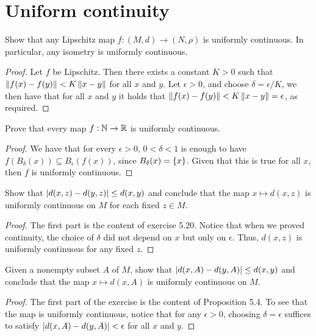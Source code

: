 \section{Uniform continuity}


\begin{exercise}{44}
Show that any Lipschitz map $f:(M,d)\to (N,\rho)$ is uniformly continuous. 
In particular, any isometry is uniformly continuous.
\end{exercise}
\begin{proof}
Let $f$ be Lipschitz.
Then there exists a constant $K>0$ such that $\left\lVert f(x)-f(y)\right\rVert < K\left\lVert x-y\right\rVert$ for all $x$ and $y$.
Let $\epsilon >0$, and choose $\delta = \epsilon/K$, we then have that for all $x$ and $y$ it holds that $\left\lVert f(x)-f(y)\right\rVert<K\left\lVert x-y\right\rVert=\epsilon$, as required.
\end{proof} 

\begin{exercise}{45}
Prove that every map $f:\mathbb{N}\to\mathbb{R}$ is uniformly continuous.
\end{exercise}
\begin{proof}
We have that for every $\epsilon>0$, $0<\delta<1$ is enough to have $f(B_\delta(x))\subseteq B_\epsilon(f(x))$, since $B_\delta(x)=\{x\}$.
Given that this is true for all $x$, then $f$ is uniformly continuous.
\end{proof} 

\begin{exercise}{46}
Show that $\left\lvert d(x,z)-d(y,z)\right\rvert \leq d(x,y)$ and conclude that the map $x\mapsto d(x,z)$ is uniformly continuous on $M$ for each fixed $z\in M$.
\end{exercise}
\begin{proof}
The first part is the content of exercise 5.20.
Notice that when we proved continuity, the choice of $\delta$ did not depend on $x$ but only on $\epsilon$.
Thus, $d(x,z)$ is uniformly continuous for any fixed $z$.
\end{proof} 

\begin{exercise}{47}
Given a nonempty subset $A$ of $M$, show that $\left\lvert d(x,A) - d(y,A)\right\rvert \leq d(x,y)$ and conclude that the map $x \mapsto d(x,A)$ is uniformly continuous on $M$.
\end{exercise}
\begin{proof}
The first part of the exercise is the content of Proposition 5.4.
To see that the map is uniformly continuous, notice that for any $\epsilon>0$, choosing $\delta=\epsilon$ suffices to satisfy $\left\lvert d(x,A) - d(y,A)\right\rvert< \epsilon$ for all $x$ and $y$.
\end{proof} 

